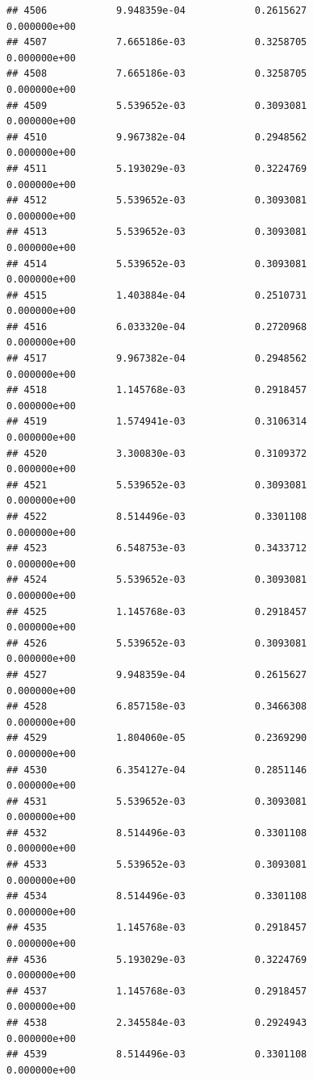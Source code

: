 \documentclass[
]{article}
\begin{document}
\begin{verbatim}
## 4506            9.948359e-04            0.2615627            0.000000e+00
## 4507            7.665186e-03            0.3258705            0.000000e+00
## 4508            7.665186e-03            0.3258705            0.000000e+00
## 4509            5.539652e-03            0.3093081            0.000000e+00
## 4510            9.967382e-04            0.2948562            0.000000e+00
## 4511            5.193029e-03            0.3224769            0.000000e+00
## 4512            5.539652e-03            0.3093081            0.000000e+00
## 4513            5.539652e-03            0.3093081            0.000000e+00
## 4514            5.539652e-03            0.3093081            0.000000e+00
## 4515            1.403884e-04            0.2510731            0.000000e+00
## 4516            6.033320e-04            0.2720968            0.000000e+00
## 4517            9.967382e-04            0.2948562            0.000000e+00
## 4518            1.145768e-03            0.2918457            0.000000e+00
## 4519            1.574941e-03            0.3106314            0.000000e+00
## 4520            3.300830e-03            0.3109372            0.000000e+00
## 4521            5.539652e-03            0.3093081            0.000000e+00
## 4522            8.514496e-03            0.3301108            0.000000e+00
## 4523            6.548753e-03            0.3433712            0.000000e+00
## 4524            5.539652e-03            0.3093081            0.000000e+00
## 4525            1.145768e-03            0.2918457            0.000000e+00
## 4526            5.539652e-03            0.3093081            0.000000e+00
## 4527            9.948359e-04            0.2615627            0.000000e+00
## 4528            6.857158e-03            0.3466308            0.000000e+00
## 4529            1.804060e-05            0.2369290            0.000000e+00
## 4530            6.354127e-04            0.2851146            0.000000e+00
## 4531            5.539652e-03            0.3093081            0.000000e+00
## 4532            8.514496e-03            0.3301108            0.000000e+00
## 4533            5.539652e-03            0.3093081            0.000000e+00
## 4534            8.514496e-03            0.3301108            0.000000e+00
## 4535            1.145768e-03            0.2918457            0.000000e+00
## 4536            5.193029e-03            0.3224769            0.000000e+00
## 4537            1.145768e-03            0.2918457            0.000000e+00
## 4538            2.345584e-03            0.2924943            0.000000e+00
## 4539            8.514496e-03            0.3301108            0.000000e+00

\end{verbatim}
\end{document}
